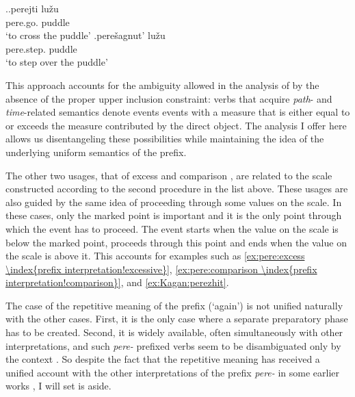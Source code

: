 
\ex.\ag.\label{ex:perejti}perejti lu\v{z}u\\
pere.go. puddle\\
\trans `to cross the puddle'
\bg.\label{ex:pereshagnut}pere\v{s}agnut' lu\v{z}u\\
pere.step. puddle\\
\trans `to step over the puddle'

This approach accounts for the ambiguity allowed in the analysis of \citet{Kagan:book} by the absence of the proper upper inclusion constraint: verbs that acquire \textit{path}- and \textit{time}-related semantics denote events events with a measure that is either equal to or exceeds the measure contributed by the direct object. The analysis I offer here allows us disentangeling these possibilities while maintaining the idea of the underlying uniform semantics of the prefix.

The other two usages, that of excess  and comparison , are related to the scale constructed according to the second procedure in the list above. These usages are also guided by the same idea of proceeding through some values on the scale. In these cases, only the marked point is important and it is the only point through which the event has to proceed. The event starts when the value on the scale is below the marked point, proceeds through this point and ends when the value on the scale is above it. This accounts for examples such as \ref{ex:pere:excess \index{prefix interpretation!excessive}}, \ref{ex:pere:comparison \index{prefix interpretation!comparison}}, and \ref{ex:Kagan:perezhit}.

The case of the repetitive  meaning of the prefix (`again') is not unified naturally with the other cases. First, it is the only case where a separate preparatory phase has to be created. Second, it is widely available, often simultaneously with other interpretations, and such \textit{pere-}  prefixed verbs seem to be disambiguated only by the context  . So despite the fact that the repetitive  meaning has received a unified account with the other interpretations of the prefix \textit{pere-}   in some earlier works \citep{Demjjanow:97, Kagan:book}, I will set is aside.

